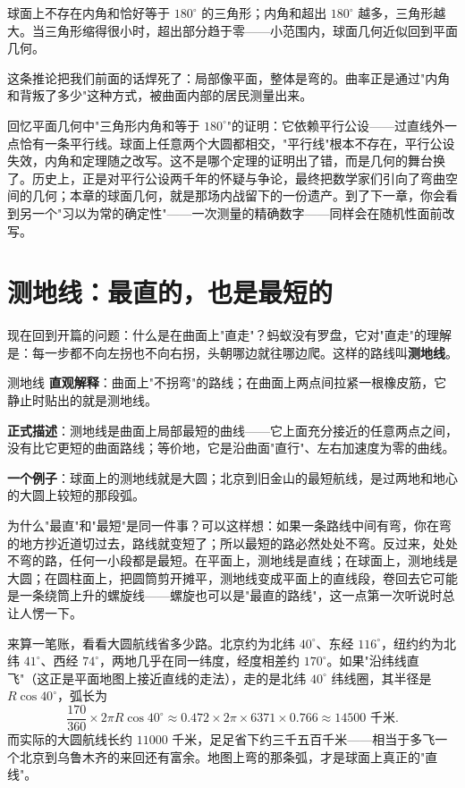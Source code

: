 \begin{tuilun}
球面上不存在内角和恰好等于 $180^\circ$ 的三角形；内角和超出 $180^\circ$ 越多，三角形越大。当三角形缩得很小时，超出部分趋于零——小范围内，球面几何近似回到平面几何。
\end{tuilun}

这条推论把我们前面的话焊死了：局部像平面，整体是弯的。曲率正是通过"内角和背叛了多少"这种方式，被曲面内部的居民测量出来。

\begin{lianjie}
回忆平面几何中"三角形内角和等于 $180^\circ$"的证明：它依赖平行公设——过直线外一点恰有一条平行线。球面上任意两个大圆都相交，"平行线"根本不存在，平行公设失效，内角和定理随之改写。这不是哪个定理的证明出了错，而是几何的舞台换了。历史上，正是对平行公设两千年的怀疑与争论，最终把数学家们引向了弯曲空间的几何；本章的球面几何，就是那场内战留下的一份遗产。到了下一章，你会看到另一个"习以为常的确定性"——一次测量的精确数字——同样会在随机性面前改写。
\end{lianjie}

\section{测地线：最直的，也是最短的}

现在回到开篇的问题：什么是在曲面上"直走"？蚂蚁没有罗盘，它对"直走"的理解是：每一步都不向左拐也不向右拐，头朝哪边就往哪边爬。这样的路线叫\textbf{测地线}。

\begin{shuyu}{测地线}
\textbf{直观解释}：曲面上"不拐弯"的路线；在曲面上两点间拉紧一根橡皮筋，它静止时贴出的就是测地线。

\textbf{正式描述}：测地线是曲面上局部最短的曲线——它上面充分接近的任意两点之间，没有比它更短的曲面路线；等价地，它是沿曲面"直行"、左右加速度为零的曲线。

\textbf{一个例子}：球面上的测地线就是大圆；北京到旧金山的最短航线，是过两地和地心的大圆上较短的那段弧。
\end{shuyu}

为什么"最直"和"最短"是同一件事？可以这样想：如果一条路线中间有弯，你在弯的地方抄近道切过去，路线就变短了；所以最短的路必然处处不弯。反过来，处处不弯的路，任何一小段都是最短。在平面上，测地线是直线；在球面上，测地线是大圆；在圆柱面上，把圆筒剪开摊平，测地线变成平面上的直线段，卷回去它可能是一条绕筒上升的螺旋线——螺旋也可以是"最直的路线"，这一点第一次听说时总让人愣一下。

来算一笔账，看看大圆航线省多少路。北京约为北纬 $40^\circ$、东经 $116^\circ$，纽约约为北纬 $41^\circ$、西经 $74^\circ$，两地几乎在同一纬度，经度相差约 $170^\circ$。如果"沿纬线直飞"（这正是平面地图上接近直线的走法），走的是北纬 $40^\circ$ 纬线圈，其半径是 $R\cos 40^\circ$，弧长为
\[ \frac{170}{360}\times 2\pi R \cos 40^\circ \approx 0.472 \times 2\pi \times 6371 \times 0.766 \approx 14500 \text{ 千米}. \]
而实际的大圆航线长约 $11000$ 千米，足足省下约三千五百千米——相当于多飞一个北京到乌鲁木齐的来回还有富余。地图上弯的那条弧，才是球面上真正的"直线"。

